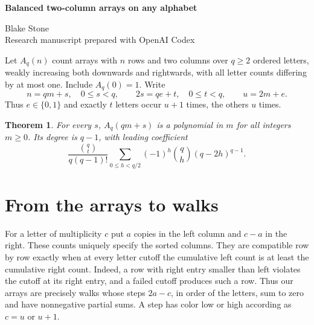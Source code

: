 \documentclass[11pt,letterpaper]{article}
\newtheorem{theorem}{Theorem}
\begin{document}
\thispagestyle{plain}
\begin{center}
{\LARGE\bfseries Balanced two-column arrays on any alphabet\par}
\vspace{0.5em}
Blake Stone\\
{\small Research manuscript prepared with OpenAI Codex}
\end{center}

\begin{abstract}
For weakly increasing two-column arrays on \(q\) letters whose multiplicities differ by at most one, we give an exact counting formula. On each residue class of the height modulo \(q\) the count is a polynomial of degree \(q-1\), valid even at the first height. We determine its leading coefficient, give the least generating-function denominator for every odd \(q\), and verify all 33 constituent polynomials in six entries of R. H. Hardin.
\end{abstract}

Let \(A_q(n)\) count arrays with \(n\) rows and two columns over \(q\ge2\) ordered letters, weakly increasing both downwards and rightwards, with all letter counts differing by at most one. Include \(A_q(0)=1\). Write
\[
 n=qm+s,\quad 0\le s<q,\qquad 2s=qe+t,\quad 0\le t<q,\qquad u=2m+e .
\]
Thus \(e\in\{0,1\}\) and exactly \(t\) letters occur \(u+1\) times, the others \(u\) times.

\begin{theorem}\label{th:poly}
For every \(s\), \(A_q(qm+s)\) is a polynomial in \(m\) for all integers \(m\ge0\). Its degree is \(q-1\), with leading coefficient
\[
 \frac{\binom qt}{q(q-1)!}
 \sum_{0\le h<q/2}(-1)^h\binom qh(q-2h)^{q-1}.
\]
\end{theorem}

\section{From the arrays to walks}
For a letter of multiplicity \(c\) put \(a\) copies in the left column and \(c-a\) in the right. These counts uniquely specify the sorted columns. They are compatible row by row exactly when at every letter cutoff the cumulative left count is at least the cumulative right count. Indeed, a row with right entry smaller than left violates the cutoff at its right entry, and a failed cutoff produces such a row. Thus our arrays are precisely walks whose steps \(2a-c\), in order of the letters, sum to zero and have nonnegative partial sums. A step has color low or high according as \(c=u\) or \(u+1\).
\end{document}
